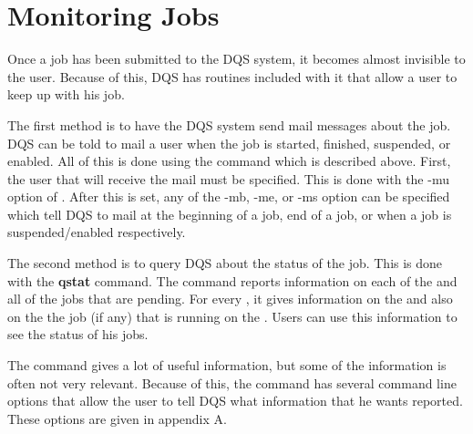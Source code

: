 \section{Monitoring Jobs}

Once a job has been submitted to the DQS system, it becomes almost
invisible to the user.  Because of this, DQS has routines included
with it that allow a user to keep up with his job.

The first method is to have the DQS system send mail messages about
the job.  DQS can be told to mail a user when the job is started,
finished, suspended, or enabled.  All of this is done using the \qsub
command which is described above.  First, the user that will receive
the mail must be specified.  This is done with the -mu option of
\qsub.  After this is set, any of the -mb, -me, or -ms option can be
specified which tell DQS to mail at the beginning of a job, end of a
job, or when a job is suspended/enabled respectively.

The second method is to query DQS about the status of the job.  This
is done with the {\bf qstat} command.  The \qstat command reports
information on each of the \queues and all of the jobs that are pending.
For every \queue, it gives
information on the \queue and also on the the job (if any) that is
running on the \queue.
Users can use this information to see the
status of his jobs.

The \qstat command gives a lot of useful information, but some of the
information is often not very relevant.  Because of this, the \qstat command
has several command line options that allow the user to tell DQS what
information that he wants reported.  These options are given in
appendix A.
